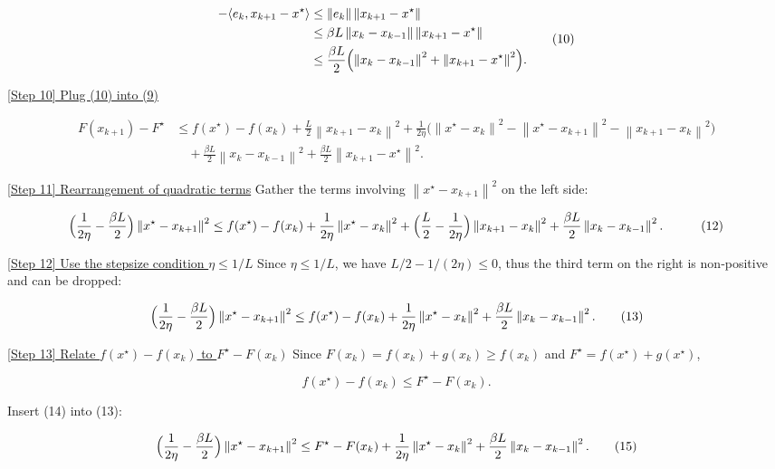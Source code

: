 \documentclass{article}
\newcommand{\norm}[1]{\left\lVert #1\right\rVert}
\newcommand{\inner}[2]{\langle #1,#2\rangle}
\begin{document}
\[
\begin{aligned}
-\inner{e_k}{x_{k+1}-x^\star}
&\le \norm{e_k}\norm{x_{k+1}-x^\star}
\\
&\le \beta L \norm{x_k-x_{k-1}}\norm{x_{k+1}-x^\star}
\\
&\le \frac{\beta L}{2}\Bigl(\norm{x_k-x_{k-1}}^{2}
+\norm{x_{k+1}-x^\star}^{2}\Bigr).
\end{aligned}
\tag{10}
\]

\noindent\underline{[Step 10] Plug (10) into (9)}  

\[
\begin{aligned}
F(x_{k+1})-F^\star
&\le f(x^\star)-f(x_k)
+\frac{L}{2}\norm{x_{k+1}-x_k}^{2}
+\frac{1}{2\eta}\bigl(\norm{x^\star-x_k}^{2}
-\norm{x^\star-x_{k+1}}^{2}
-\norm{x_{k+1}-x_k}^{2}\bigr)\\
&\quad+\frac{\beta L}{2}\norm{x_k-x_{k-1}}^{2}
+\frac{\beta L}{2}\norm{x_{k+1}-x^\star}^{2}.
\end{aligned}
\tag{11}
\]

\noindent\underline{[Step 11] Rearrangement of quadratic terms}  
Gather the terms involving $\norm{x^\star-x_{k+1}}^{2}$ on the left side:

\[
\begin{aligned}
\Bigl(\frac{1}{2\eta}-\frac{\beta L}{2}\Bigr)\norm{x^\star-x_{k+1}}^{2}
&\le f(x^\star)-f(x_k)
+\frac{1}{2\eta}\norm{x^\star-x_k}^{2}
+\Bigl(\frac{L}{2}-\frac{1}{2\eta}\Bigr)\norm{x_{k+1}-x_k}^{2}
+\frac{\beta L}{2}\norm{x_k-x_{k-1}}^{2}.
\end{aligned}
\tag{12}
\]

\noindent\underline{[Step 12] Use the stepsize condition $\eta\le 1/L$}  
Since $\eta\le 1/L$, we have $L/2-1/(2\eta)\le 0$, thus the third term on the right is non‑positive and can be dropped:

\[
\Bigl(\frac{1}{2\eta}-\frac{\beta L}{2}\Bigr)\norm{x^\star-x_{k+1}}^{2}
\le f(x^\star)-f(x_k)
+\frac{1}{2\eta}\norm{x^\star-x_k}^{2}
+\frac{\beta L}{2}\norm{x_k-x_{k-1}}^{2}.
\tag{13}
\]

\noindent\underline{[Step 13] Relate $f(x^\star)-f(x_k)$ to $F^\star-F(x_k)$}  
Since $F(x_k)=f(x_k)+g(x_k)\ge f(x_k)$ and $F^\star=f(x^\star)+g(x^\star)$,  

\[
f(x^\star)-f(x_k)\le F^\star-F(x_k).
\tag{14}
\]

Insert (14) into (13):

\[
\Bigl(\frac{1}{2\eta}-\frac{\beta L}{2}\Bigr)\norm{x^\star-x_{k+1}}^{2}
\le F^\star-F(x_k)
+\frac{1}{2\eta}\norm{x^\star-x_k}^{2}
+\frac{\beta L}{2}\norm{x_k-x_{k-1}}^{2}.
\tag{15}
\]
\end{document}
